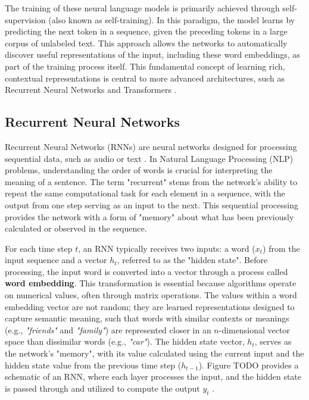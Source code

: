     The training of these neural language models is primarily achieved through self-supervision (also known as self-training). In this paradigm, the model learns by predicting the next token in a sequence, given the preceding tokens in a large corpus of unlabeled text. This approach allows the networks to automatically discover useful representations of the input, including these word embeddings, as part of the training process itself. This fundamental concept of learning rich, contextual representations is central to more advanced architectures, such as Recurrent Neural Networks and Transformers \cite{jm3_llm_book}.

    \subsection{Recurrent Neural Networks}
    
    Recurrent Neural Networks (RNNs) are neural networks designed for processing sequential data, such as audio or text \cite{Elman1990FindingSI}. In Natural Language Processing (NLP) problems, understanding the order of words is crucial for interpreting the meaning of a sentence. The term "recurrent" stems from the network's ability to repeat the same computational task for each element in a sequence, with the output from one step serving as an input to the next. This sequential processing provides the network with a form of "memory" about what has been previously calculated or observed in the sequence.
    
    For each time step $t$, an RNN typically receives two inputs: a word ($x_t$) from the input sequence and a vector $h_t$, referred to as the "hidden state". Before processing, the input word is converted into a vector through a process called \textbf{word embedding}. This transformation is essential because algorithms operate on numerical values, often through matrix operations. The values within a word embedding vector are not random; they are learned representations designed to capture semantic meaning, such that words with similar contexts or meanings (e.g., \textit{"friends"} and \textit{"family"}) are represented closer in an $n$-dimensional vector space than dissimilar words (e.g., \textit{"car"}). The hidden state vector, $h_t$, serves as the network's "memory", with its value calculated using the current input and the hidden state value from the previous time step ($h_{t-1}$). Figure TODO provides a schematic of an RNN, where each layer processes the input, and the hidden state is passed through and utilized to compute the output $y_t$ \cite{jm3_llm_book}.
    
